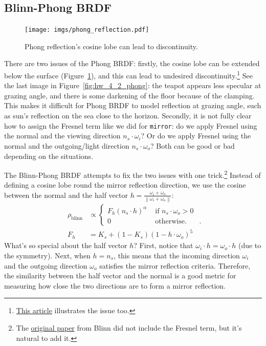 \subsection{Blinn-Phong BRDF}
\begin{figure}[ht]
    \centering
    \texttt{[image: imgs/phong\_reflection.pdf]}
    \caption{Phong reflection's cosine lobe can lead to discontinuity.}
    \label{fig:phong_reflection}
\end{figure}

There are two issues of the Phong BRDF: firstly, the cosine lobe can be extended below the surface (Figure~\ref{fig:phong_reflection}), and this can lead to undesired discontinuity.\footnote{\href{https://learnopengl.com/Advanced-Lighting/Advanced-Lighting}{This article} illustrates the issue too.} See the last image in Figure~\ref{fig:hw_4_2_phong}: the teapot appears less specular at grazing angle, and there is some darkening of the floor because of the clamping. This makes it difficult for Phong BRDF to model reflection at grazing angle, such as sun's reflection on the sea close to the horizon.
Secondly, it is not fully clear how to assign the Fresnel term like we did for \lstinline{mirror}: do we apply Fresnel using the normal and the viewing direction $n_s \cdot \omega_i$? Or do we apply Fresnel using the normal and the outgoing/light direction $n_s \cdot \omega_o$? Both can be good or bad depending on the situations.

The Blinn-Phong BRDF attempts to fix the two issues with one trick.\footnote{The \href{https://dl.acm.org/doi/10.1145/360349.360353}{original paper} from Blinn did not include the Fresnel term, but it's natural to add it.} 
Instead of defining a cosine lobe round the mirror reflection direction, we use the cosine between the normal and the half vector $h = \frac{\omega_i + \omega_o}{\left\|\omega_i + \omega_o\right\|}$:
\begin{equation}
\begin{aligned}
\rho_{\text{blinn}} &\propto \begin{cases}
F_h \left(n_s \cdot h\right)^{\alpha} & \text{ if } n_s \cdot \omega_o > 0 \\
0 & \text{ otherwise.} 
\end{cases} \\
F_h &= K_s + (1 - K_s) (1 - h \cdot \omega_o)^5
\label{eq:schilick_fresnel}
\end{aligned}.
\end{equation}
What's so special about the half vector $h$? First, notice that $\omega_i \cdot h = \omega_o \cdot h$ (due to the symmetry). Next, when $h = n_s$, this means that the incoming direction $\omega_i$ and the outgoing direction $\omega_o$ satisfies the mirror reflection criteria. Therefore, the similarity between the half vector and the normal is a good metric for measuring how close the two directions are to form a mirror reflection.

